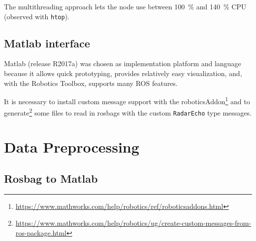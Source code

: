 \begin{samepage}
\begin{Shaded}
\begin{Highlighting}[]

\NormalTok{    [=] ()}
\NormalTok{    \{}
\NormalTok{    \}}
\NormalTok{);}
\end{Highlighting}
\end{Shaded}
\end{samepage}

The multithreading approach lets the node use between \SI{100}{\%} and \SI{140}{\%}
CPU (observed with \texttt{htop}).

\subsection{Matlab interface}\label{matlab}

Matlab (release R2017a) was chosen as implementation platform and language because it allows quick prototyping, provides relatively easy visualization, and, with the Robotics Toolbox, supports many ROS features.

It is necessary to install custom message support with the roboticsAddon\footnote{\url{https://www.mathworks.com/help/robotics/ref/roboticsaddons.html}} and to generate\footnote{\url{https://www.mathworks.com/help/robotics/ug/create-custom-messages-from-ros-package.html}} some files to read in rosbags with the custom \texttt{RadarEcho} type messages.

\section{Data Preprocessing}\label{data-preprocessing}

\subsection{Rosbag to Matlab}\label{rosbag-to-matlab}

